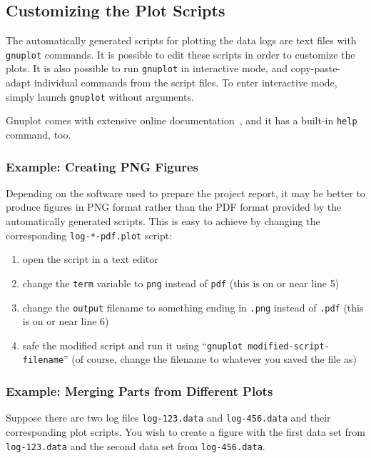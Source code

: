 \documentclass[a4paper,10pt]{article}
\begin{document}
\subsection{Customizing the Plot Scripts}

The automatically generated scripts for plotting the data logs are text files with \texttt{gnuplot} commands.
It is possible to edit these scripts in order to customize the plots.
It is also possible to run \texttt{gnuplot} in interactive mode, and copy-paste-adapt individual commands from the script files.
To enter interactive mode, simply launch \texttt{gnuplot} without arguments.

Gnuplot comes with extensive online documentation~\cite{gnuplot}, and it has a built-in \texttt{help} command, too.



\subsubsection{Example: Creating PNG Figures}

Depending on the software used to prepare the project report, it may be better to produce figures in PNG format rather than the PDF format provided by the automatically generated scripts.
This is easy to achieve by changing the corresponding \texttt{log-*-pdf.plot} script:

\begin{enumerate}
\item
  open the script in a text editor
\item
  change the \texttt{term} variable to \texttt{png} instead of \texttt{pdf} (this is on or near line 5)
\item
  change the \texttt{output} filename to something ending in \texttt{.png} instead of \texttt{.pdf} (this is on or near line 6)
\item
  safe the modified script and run it using ``\texttt{gnuplot modified-script-filename}'' (of course, change the filename to whatever you saved the file as)
\end{enumerate}



\subsubsection{Example: Merging Parts from Different Plots}

Suppose there are two log files \texttt{log-123.data} and \texttt{log-456.data} and their corresponding plot scripts.
You wish to create a figure with the first data set from \texttt{log-123.data} and the second data set from \texttt{log-456.data}.
\end{document}
